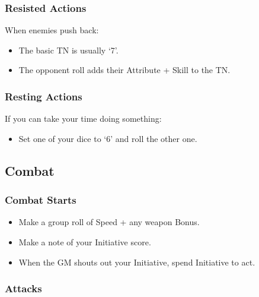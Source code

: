 \begin{multicols}{2}
\begin{itemize}
\end{itemize}

\subsubsection{Resisted Actions}

When enemies push back:

\begin{itemize}

	\item{The basic TN is usually `7'.}
	\item{The opponent roll adds their Attribute + Skill to the TN.}

\end{itemize}

\subsubsection{Resting Actions}

If you can take your time doing something:

\begin{itemize}

	\item{Set one of your dice to `6' and roll the other one.}
	
\end{itemize}

\subsection{Combat}

\subsubsection{Combat Starts}

\begin{itemize}

	\item{Make a group roll of Speed + any weapon Bonus.}
	\item{Make a note of your Initiative score.}
	\item{When the GM shouts out your Initiative, spend Initiative to act.}

\end{itemize}

\subsubsection{Attacks}


\end{multicols}
